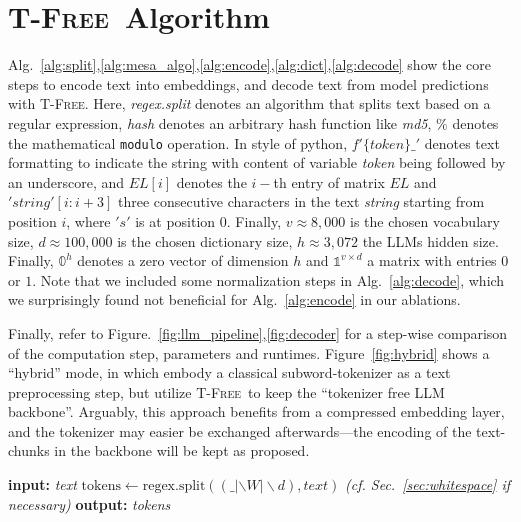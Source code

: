 \documentclass[11pt]{article}
\newcommand{\method}{\textsc{T-Free}}
\begin{document}
\section{\method\ Algorithm}
\label{app:mesa_algo}
Alg.~\ref{alg:split},\ref{alg:mesa_algo},\ref{alg:encode},\ref{alg:dict},\ref{alg:decode} show the core steps to encode text into embeddings, and decode text from model predictions with \method.
Here, \emph{regex.split} denotes an algorithm that splits text based on a regular expression, \emph{hash} denotes an arbitrary hash function like \emph{md5}, $\%$ denotes the mathematical \texttt{modulo} operation.
In style of python, $f'\{token\}\_'$ denotes text formatting to indicate the string with content of variable \emph{token} being followed by an underscore, and $EL[i]$ denotes the $i-$th entry of matrix $EL$ and $'string'[i:i+3]$ three consecutive characters in the text \emph{string} starting from position $i$, where $'s'$ is at position $0$.
Finally, $v\approx 8,000$ is the chosen vocabulary size,
$d\approx 100,000$ is the chosen dictionary size, $h\approx 3,072$ the LLMs hidden size. 
Finally, $\mathbb{0}^h$ denotes a zero vector of dimension $h$ and $\mathbb{1}^{v\times d}$ a matrix with entries $0$ or $1$.
Note that we included some normalization steps in Alg.~\ref{alg:decode}, which we surprisingly found not beneficial for Alg.~\ref{alg:encode} in our ablations.

Finally, refer to Figure.~\ref{fig:llm_pipeline},\ref{fig:decoder} for a step-wise comparison of the computation step, parameters and runtimes. Figure~\ref{fig:hybrid} shows a ``hybrid'' mode, in which embody a classical subword-tokenizer as a text preprocessing step, but utilize \method~to keep the ``tokenizer free LLM backbone''. Arguably, this approach benefits from a compressed embedding layer, and the tokenizer may easier be exchanged afterwards---the encoding of the text-chunks in the backbone will be kept as proposed.

\begin{algorithm}[h]
\caption{token\_split}\label{alg:split}\label{alg:mesa_algo}\label{alg:mesa_algo_decode}
\begin{algorithmic}
\State \textbf{input:} \emph{text} \vspace{4px}
\State $\textrm{tokens}\gets \textrm{regex.split}((\_|\backslash W|\backslash d), text)$
\State \emph{(cf. Sec.~\ref{sec:whitespace} if necessary)}\vspace{4px}
\State \textbf{output:} \emph{tokens}
\end{algorithmic}
\end{algorithm}
\end{document}
